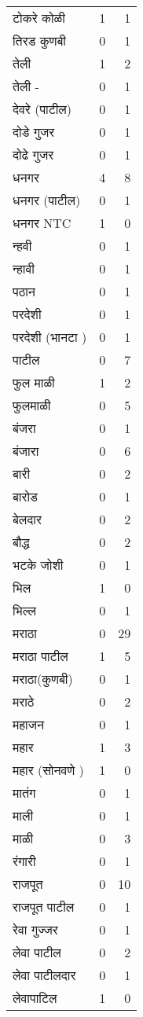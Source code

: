 \documentclass{article}
\begin{document}
\begin{table}
\begin{tabular}{lrr}
टोकरे कोळी & 1 & 1 \\
तिरड कुणबी & 0 & 1 \\
तेली & 1 & 2 \\
तेली - & 0 & 1 \\
देवरे (पाटील) & 0 & 1 \\
दोडे गुजर & 0 & 1 \\
दोढे गुजर & 0 & 1 \\
धनगर & 4 & 8 \\
धनगर (पाटील) & 0 & 1 \\
धनगर NTC & 1 & 0 \\
न्हवी & 0 & 1 \\
न्हावी & 0 & 1 \\
पठान & 0 & 1 \\
परदेशी & 0 & 1 \\
परदेशी (भानटा ) & 0 & 1 \\
पाटील & 0 & 7 \\
फुल माळी & 1 & 2 \\
फुलमाळी & 0 & 5 \\
बंजरा & 0 & 1 \\
बंजारा & 0 & 6 \\
बारी & 0 & 2 \\
बारोड & 0 & 1 \\
बेलदार & 0 & 2 \\
बौद्ध & 0 & 2 \\
भटके जोशी & 0 & 1 \\
भिल & 1 & 0 \\
भिल्ल & 0 & 1 \\
मराठा & 0 & 29 \\
मराठा पाटील & 1 & 5 \\
मराठा(कुणबी) & 0 & 1 \\
मराठे & 0 & 2 \\
महाजन & 0 & 1 \\
महार & 1 & 3 \\
महार (सोनवणे ) & 1 & 0 \\
मातंग & 0 & 1 \\
माली & 0 & 1 \\
माळी & 0 & 3 \\
रंगारी & 0 & 1 \\
राजपूत & 0 & 10 \\
राजपूत पाटील & 0 & 1 \\
रेवा गुज्जर & 0 & 1 \\
लेवा पाटील & 0 & 2 \\
लेवा पाटीलदार & 0 & 1 \\
लेवापाटिल & 1 & 0 \\

\end{tabular}
\end{table}
\end{document}

